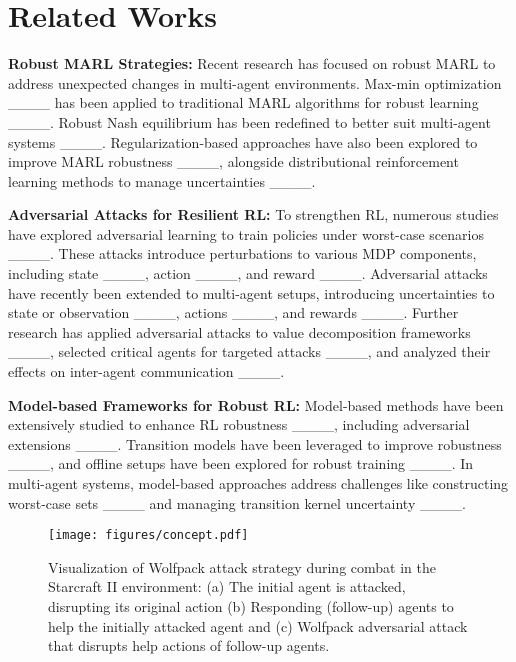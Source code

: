 \section{Related Works}
\textbf{Robust MARL Strategies:}
Recent research has focused on robust MARL to address unexpected changes in multi-agent environments. Max-min optimization ____ has been applied to traditional MARL algorithms for robust learning ____. Robust Nash equilibrium has been redefined to better suit multi-agent systems ____. Regularization-based approaches have also been explored to improve MARL robustness ____, alongside distributional reinforcement learning methods to manage uncertainties ____.

\textbf{Adversarial Attacks for Resilient RL:}
To strengthen RL, numerous studies have explored adversarial learning to train policies under worst-case scenarios ____. These attacks introduce perturbations to various MDP components, including state ____, action ____, and reward ____. Adversarial attacks have recently been extended to multi-agent setups, introducing uncertainties to state or observation ____, actions ____, and rewards ____. Further research has applied adversarial attacks to value decomposition frameworks ____, selected critical agents for targeted attacks ____, and analyzed their effects on inter-agent communication ____.

\textbf{Model-based Frameworks for Robust RL:}
Model-based methods have been extensively studied to enhance RL robustness ____, including adversarial extensions ____. Transition models have been leveraged to improve robustness ____, and offline setups have been explored for robust training ____. In multi-agent systems, model-based approaches address challenges like constructing worst-case sets ____ and managing transition kernel uncertainty ____.


\begin{figure*}[ht!]
    \centering
    \vspace{-0.1in}
    \texttt{[image: figures/concept.pdf]}
    \vspace{-0.2in}
    \caption{Visualization of Wolfpack attack strategy during combat in the Starcraft II environment: (a) The initial agent is attacked, disrupting its original action (b) Responding (follow-up) agents to help the initially attacked agent and (c) Wolfpack adversarial attack that disrupts help actions of follow-up agents.}
    \vspace{-0.2in}
    \label{fig:concept}
\end{figure*}
